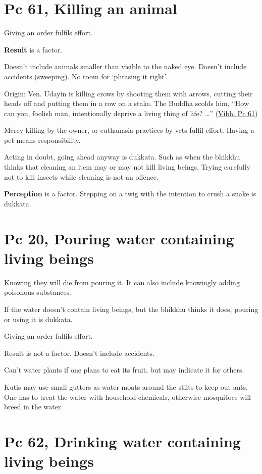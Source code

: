 \section{Pc 61, Killing an animal}

Giving an order fulfils effort.

\textbf{Result} is a factor.

Doesn't include animals smaller than visible to the naked eye. Doesn't
include accidents (sweeping). No room for `phrasing it right'.

Origin: Ven. Udayin is killing crows by shooting them with arrows,
cutting their heads off and putting them in a row on a stake. The Buddha
scolds him, ``How can you, foolish man, intentionally deprive a living
thing of life? \ldots{}''
(\href{https://suttacentral.net/pli-tv-bu-vb-pc61/en/horner}{Vibh. Pc
61})

Mercy killing by the owner, or euthanasia practices by vets fulfil
effort. Having a pet means responsibility.

Acting in doubt, going ahead anyway is dukkata. Such as when the bhikkhu
thinks that cleaning an item may or may not kill living beings. Trying
carefully not to kill insects while cleaning is not an offence.

\textbf{Perception} is a factor. Stepping on a twig with the intention
to crush a snake is dukkata.

\section{Pc 20, Pouring water containing living beings}

Knowing they will die from pouring it. It can also include knowingly
adding poisonous substances.

If the water doesn't contain living beings, but the bhikkhu thinks it
does, pouring or using it is dukkata.

Giving an order fulfils effort.

Result is not a factor. Doesn't include accidents.

Can't water plants if one plans to eat its fruit, but may indicate it
for others.

Kutis may use small gutters as water moats around the stilts to keep out
ants. One has to treat the water with household chemicals, otherwise
mosquitoes will breed in the water.

\section{Pc 62, Drinking water containing living beings}

